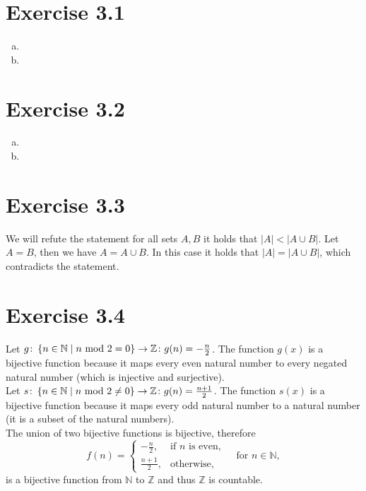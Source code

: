 \documentclass{article} %
\newcommand{\homeworkNumber}{3}
\begin{document}
\section*{Exercise \homeworkNumber.1}

\begin{enumerate}[(a)]
	\item
	\item
\end{enumerate}



\section*{Exercise \homeworkNumber.2}

\begin{enumerate}[(a)]
	\item
	\item
\end{enumerate}



\section*{Exercise \homeworkNumber.3}
We will refute the statement for all sets \( A,B \) it holds that \( |A| < |A \cup B| \). Let \( A = B \), then we have \( A = A \cup B \). In this case it holds that \( |A| = |A \cup B| \), which contradicts the statement.



\section*{Exercise \homeworkNumber.4}

Let \( g \colon \left\{ n \in \mathbb{N} \mid n \text{ mod } 2 = 0 \\ \right\} \to \mathbb{Z} \colon g(n) = -\frac{n}{2} \).
The function \( g(x) \) is a bijective function because it maps every
even natural number to every negated natural number (which is injective and surjective). \\
Let \( s \colon \left\{ n \in \mathbb{N} \mid n \text{ mod } 2 \neq  0 \\ \right\} \to \mathbb{Z} \colon g(n) = \frac{n+1}{2} \).
The function \( s(x) \) is a bijective function because it maps every odd natural number to a natural number
(it is a subset of the natural numbers). \\
The union of two bijective functions is bijective, therefore
\begin{equation*}
	f(n) =
	\begin{cases}
		-\frac{n}{2},  & \text{if } n \text{ is even}, \\
		\frac{n+1}{2}, & \text{otherwise},
	\end{cases}
	\quad \text{for } n \in \mathbb{N},
\end{equation*}
is a bijective function from \( \mathbb{N} \) to \( \mathbb{Z} \) and thus \( \mathbb{Z} \) is countable.
\end{document}
